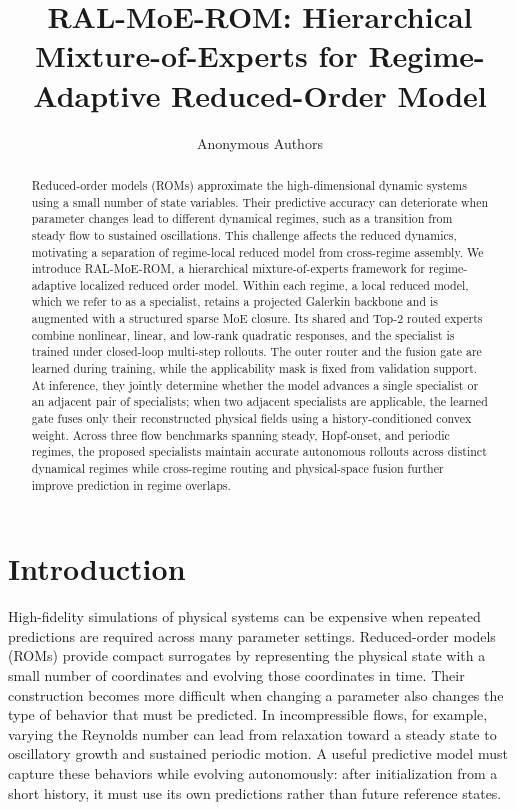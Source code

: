 \documentclass{article}
\title{RAL-MoE-ROM: Hierarchical Mixture-of-Experts for Regime-Adaptive  Reduced-Order Model }
\author{Anonymous Authors}
\begin{document}
\raggedbottom

\maketitle

\begin{abstract}
Reduced-order models (ROMs)  approximate the high-dimensional dynamic systems using a small number of state variables.  Their predictive accuracy can deteriorate when parameter changes lead to different dynamical regimes, such as a transition from steady flow to sustained oscillations. This challenge affects the reduced dynamics, motivating a separation of regime-local reduced model from cross-regime assembly.  We introduce RAL-MoE-ROM, a hierarchical mixture-of-experts framework for regime-adaptive  localized reduced order model. Within each regime, a local reduced model, which we refer to as a specialist, retains a projected Galerkin backbone and is augmented with a structured sparse MoE closure. Its shared and Top-2 routed experts combine nonlinear, linear, and low-rank quadratic responses, and the specialist is trained under closed-loop multi-step rollouts.  The outer router and the fusion gate are learned during training, while the applicability mask is fixed from validation support. At inference, they jointly determine whether the model advances a single specialist or an adjacent pair of specialists; when two adjacent specialists are applicable, the learned gate fuses only their reconstructed physical fields using a history-conditioned convex weight. Across three flow  benchmarks spanning steady, Hopf-onset, and periodic regimes, the proposed specialists maintain accurate autonomous rollouts across distinct dynamical regimes while cross-regime routing and physical-space fusion further improve prediction in regime overlaps.
\end{abstract}

\section{Introduction}

High-fidelity simulations of physical systems can be expensive when repeated predictions are required across many parameter settings. Reduced-order models (ROMs) provide compact surrogates by representing the physical state with a small number of coordinates and evolving those coordinates in time. Their construction becomes more difficult when changing a parameter also changes the type of behavior that must be predicted. In incompressible flows, for example, varying the Reynolds number can lead from relaxation toward a steady state to oscillatory growth and sustained periodic motion. A useful predictive model must capture these behaviors while evolving autonomously: after initialization from a short history, it must use its own predictions rather than future reference states.
\end{document}
